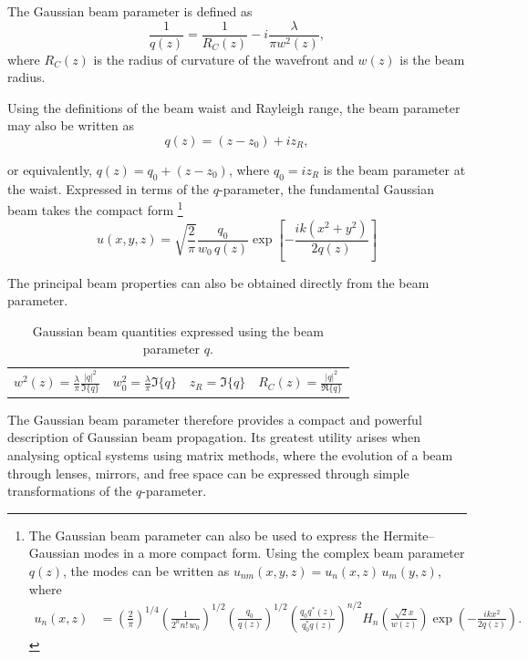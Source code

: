 \documentclass{report}
\begin{document}
The Gaussian beam parameter is defined as
\begin{equation}
\frac{1}{q(z)}
=
\frac{1}{R_C(z)}
-
i\frac{\lambda}{\pi w^2(z)},
\end{equation}
where $R_C(z)$ is the radius of curvature of the wavefront and $w(z)$ is the beam radius.

Using the definitions of the beam waist and Rayleigh range, the beam parameter may also be written as
\begin{equation}
\boxed{
q(z)
=
(z-z_0)+iz_R},
\end{equation}

or equivalently, $q(z)=q_0+(z-z_0)$, where $q_0 = iz_R$ is the beam parameter at the waist. Expressed in terms of the $q$-parameter, the fundamental Gaussian beam takes the compact form \footnote{The Gaussian beam parameter can also be used to express the Hermite--Gaussian modes in a more compact form. Using the complex beam parameter $q(z)$, the modes can be written as $u_{nm}(x,y,z)=u_n(x,z)\,u_m(y,z)$, where
\begin{align}
u_n(x,z)
&=
\left(\frac{2}{\pi}\right)^{1/4}
\left(\frac{1}{2^n n! \, w_0}\right)^{1/2}
\left(\frac{q_0}{q(z)}\right)^{1/2}
\left(
\frac{q_0 q^*(z)}
     {q_0^* q(z)}
\right)^{n/2}
H_n\!\left(
\frac{\sqrt{2}x}{w(z)}
\right)
\exp\!\left(
-\frac{ikx^2}{2q(z)}
\right).
\end{align}}
\begin{equation}
\boxed{
u(x,y,z)
=
\sqrt{\frac{2}{\pi}}
\frac{q_0}{w_0\,q(z)}
\exp\!\left[
-\frac{ik(x^2+y^2)}{2q(z)}
\right]}
\end{equation}

The principal beam properties can also be obtained directly from the beam parameter. 
\begin{table}[h]
\centering
\caption{Gaussian beam quantities expressed using the beam parameter $q$.}
\begin{tabular}{c|c|c|c}

$\displaystyle w^2(z)=\frac{\lambda}{\pi}\frac{|q|^2}{\Im\{q\}}$
&
$\displaystyle w_0^2=\frac{\lambda}{\pi}\Im\{q\}$
&
$\displaystyle z_R=\Im\{q\}$
&
$\displaystyle R_C(z)=\frac{|q|^2}{\Re\{q\}}$
\\

\end{tabular}
\label{tab:q_parameter_summary}
\end{table}

The Gaussian beam parameter therefore provides a compact and powerful description of Gaussian beam propagation. Its greatest utility arises when analysing optical systems using matrix methods, where the evolution of a beam through lenses, mirrors, and free space can be expressed through simple transformations of the $q$-parameter.
\end{document}
